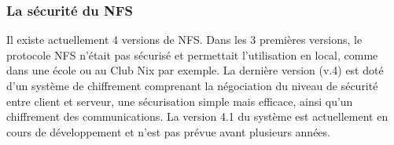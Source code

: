 \subsubsection{La sécurité du NFS}

Il existe actuellement 4 versions de NFS. Dans les 3 premières versions, le protocole NFS n'était pas sécurisé et permettait
l'utilisation en local, comme dans une école ou au Club Nix par exemple. La dernière version (v.4)
 est doté d'un système de chiffrement comprenant la négociation du niveau de sécurité entre client et serveur,
  une sécurisation simple mais efficace, ainsi qu'un chiffrement des communications.
La version 4.1 du système est actuellement en cours de développement et n'est pas prévue avant plusieurs années.
